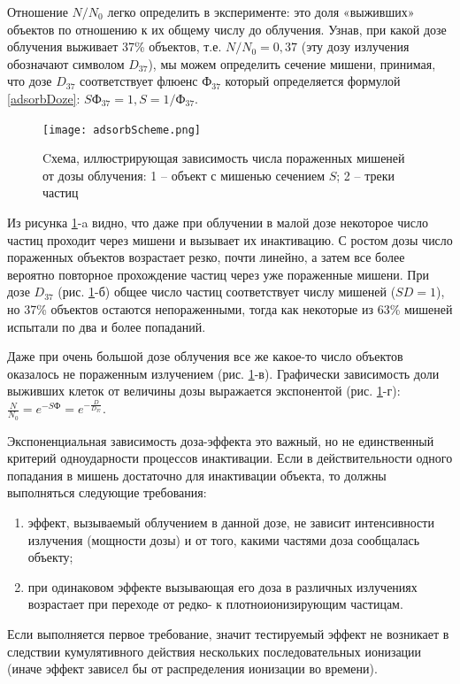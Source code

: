 \documentclass[a4paper, 14pt]{article}
\begin{document}
Отношение $N/N_0$ легко определить в эксперименте: это доля «выживших»
объектов по отношению к их общему числу до облучения. Узнав, при какой дозе
облучения выживает 37\% объектов, т.е. $N/N_0 = 0,37$ (эту дозу излучения обозначают
символом $D_{37}$), мы можем определить сечение мишени, принимая, что дозе $D_{37}$
соответствует флюенс Ф$_{37}$ который определяется формулой \ref{adsorbDoze}: $S\text{Ф}_{37} =1, S =1/\text{Ф}_{37}$.

\begin{figure}[htbp]
    \centering
    \texttt{[image: adsorbScheme.png]}
    \caption{Cхема, иллюстрирующая зависимость числа пораженных
    мишеней от дозы облучения: 1 – объект с мишенью сечением $S$; 2 – треки частиц}
    \label{adsorbScheme}
\end{figure}
Из рисунка \ref{adsorbScheme}-a видно, что даже при облучении в малой дозе
некоторое число частиц проходит через мишени и вызывает их инактивацию. С
ростом дозы число пораженных объектов возрастает резко, почти линейно, а затем все
более вероятно повторное прохождение частиц через уже пораженные мишени. При
дозе $D_{37}$ (рис. \ref{adsorbScheme}-б) общее число частиц соответствует числу мишеней ($SD =1$), но 37\% объектов остаются непораженными, тогда как некоторые из 63\% мишеней испытали по два и более попаданий.

Даже при очень большой дозе облучения все же какое-то число объектов оказалось не пораженным излучением (рис. \ref{adsorbScheme}-в). Графически зависимость доли выживших клеток от величины дозы выражается экспонентой (рис. \ref{adsorbScheme}-г): $\frac{N}{N_0} = e^{-S\text{Ф}} = e^{-\frac{D}{D_{37}}}$.

Экспоненциальная зависимость доза-эффекта это важный, но не единственный
критерий одноударности процессов инактивации. Если в действительности одного
попадания в мишень достаточно для инактивации объекта, то должны выполняться
следующие требования:
\begin{enumerate}
    \item эффект, вызываемый облучением в данной дозе, не зависит интенсивности
    излучения (мощности дозы) и от того, какими частями доза сообщалась объекту;
    \item при одинаковом эффекте вызывающая его доза в различных излучениях
    возрастает при переходе от редко- к плотноионизирующим частицам.
\end{enumerate}
Если выполняется первое требование, значит тестируемый эффект не возникает
в следствии кумулятивного действия нескольких последовательных ионизации (иначе
эффект зависел бы от распределения ионизации во времени).
\end{document}
